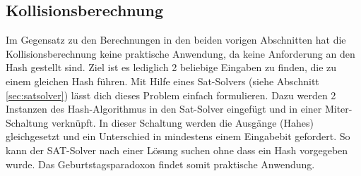\subsection{Kollisionsberechnung}
\label{sec:kollisionsberechnung}
Im Gegensatz zu den Berechnungen in den beiden vorigen Abschnitten hat die Kollisionsberechnung keine praktische Anwendung, da keine Anforderung an
den Hash gestellt sind. Ziel ist es lediglich 2 beliebige Eingaben zu finden, die zu einem gleichen Hash führen. Mit Hilfe eines Sat-Solvers
(siehe Abschnitt \ref{sec:satsolver}) lässt dich dieses Problem einfach formulieren. Dazu werden 2 Instanzen des Hash-Algorithmus in den Sat-Solver eingefügt
und in einer Miter-Schaltung \cite{mitergraph} verknüpft. In dieser Schaltung werden die Ausgänge (Hahes) gleichgesetzt und ein Unterschied in mindestens
einem Eingabebit gefordert. So kann der SAT-Solver nach einer Lösung suchen ohne dass ein Hash vorgegeben wurde. Das Geburtstagsparadoxon findet somit
praktische Anwendung.